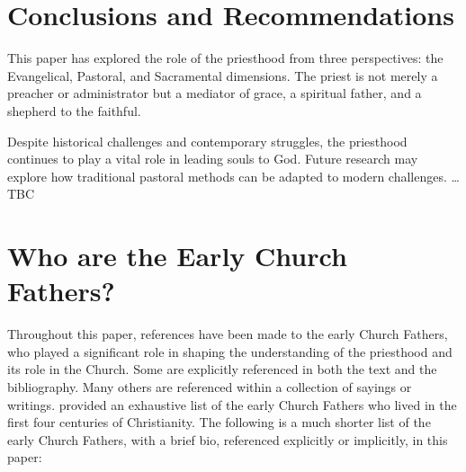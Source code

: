 \documentclass[12pt, doc]{apa7}   	%
\begin{document}
\section{Conclusions and Recommendations}

This paper has explored the role of the priesthood from three perspectives: the Evangelical, Pastoral, and Sacramental dimensions. The priest is not merely a preacher or administrator but a mediator of grace, a spiritual father, and a shepherd to the faithful. 

Despite historical challenges and contemporary struggles, the priesthood continues to play a vital role in leading souls to God. Future research may explore how traditional pastoral methods can be adapted to modern challenges. \dots TBC


\appendix{}
\section{Who are the Early Church Fathers?}\label{early_fathers}
Throughout this paper, references have been made to the early Church Fathers, who played a significant role in shaping the understanding of the priesthood and its role in the Church.  Some are explicitly referenced in both the text and the bibliography.  Many others are referenced within a collection of sayings or writings. \citet{early_church_akin} provided an exhaustive list of the early Church Fathers who lived in the first four centuries of Christianity.  The following is a much shorter list of the early Church Fathers, with a brief bio, referenced explicitly or implicitly, in this paper:
\end{document}
